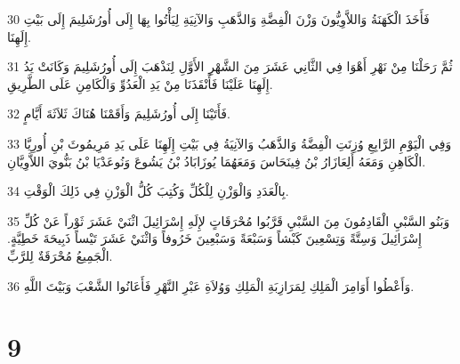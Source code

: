 \par 30 فَأَخَذَ الْكَهَنَةُ وَاللاَّوِيُّونَ وَزْنَ الْفِضَّةِ وَالذَّهَبِ وَالآنِيَةِ لِيَأْتُوا بِهَا إِلَى أُورُشَلِيمَ إِلَى بَيْتِ إِلَهِنَا.
\par 31 ثُمَّ رَحَلْنَا مِنْ نَهْرِ أَهْوَا فِي الثَّانِي عَشَرَ مِنَ الشَّهْرِ الأَوَّلِ لِنَذْهَبَ إِلَى أُورُشَلِيمَ وَكَانَتْ يَدُ إِلَهِنَا عَلَيْنَا فَأَنْقَذَنَا مِنْ يَدِ الْعَدُوِّ وَالْكَامِنِ عَلَى الطَّرِيقِ.
\par 32 فَأَتَيْنَا إِلَى أُورُشَلِيمَ وَأَقَمْنَا هُنَاكَ ثَلاَثَةَ أَيَّامٍ.
\par 33 وَفِي الْيَوْمِ الرَّابِعِ وُزِنَتِ الْفِضَّةُ وَالذَّهَبُ وَالآنِيَةُ فِي بَيْتِ إِلَهِنَا عَلَى يَدِ مَرِيمُوثَ بْنِ أُورِيَّا الْكَاهِنِ وَمَعَهُ أَلِعَازَارُ بْنُ فِينَحَاسَ وَمَعَهُمَا يُوزَابَادُ بْنُ يَشُوعَ وَنُوعَدْيَا بْنُ بَنُّويَ اللاَّوِيَّانِ.
\par 34 بِالْعَدَدِ وَالْوَزْنِ لِلْكُلِّ وَكُتِبَ كُلُّ الْوَزْنِ فِي ذَلِكَ الْوَقْتِ.
\par 35 وَبَنُو السَّبْيِ الْقَادِمُونَ مِنَ السَّبْيِ قَرَّبُوا مُحْرَقَاتٍ لإِلَهِ إِسْرَائِيلَ اثْنَيْ عَشَرَ ثَوْراً عَنْ كُلِّ إِسْرَائِيلَ وَسِتَّةً وَتِسْعِينَ كَبْشاً وَسَبْعَةً وَسَبْعِينَ خَرُوفاً وَاثْنَيْ عَشَرَ تَيْساً ذَبِيحَةَ خَطِيَّةٍ. الْجَمِيعُ مُحْرَقَةٌ لِلرَّبِّ.
\par 36 وَأَعْطُوا أَوَامِرَ الْمَلِكِ لِمَرَازِبَةِ الْمَلِكِ وَوُلاَةِ عَبْرِ النَّهْرِ فَأَعَانُوا الشَّعْبَ وَبَيْتَ اللَّهِ.

\chapter{9}

